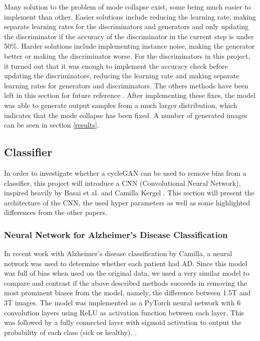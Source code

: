 \documentclass[12pt, fleqn, titlepage]{article}
\begin{document}
Many solution to the problem of mode collapse exist, some being much easier to implement than other. Easier solutions include reducing the learning rate, making separate learning rates for the discriminators and generators and only updating the discriminator if the accuracy of the discriminator in the current step is under 50\%. Harder solutions include implementing instance noise, making the generator better or making the discriminator worse. For the discriminators in this project, it turned out that it was enough to implement the accuracy check before updating the discriminators, reducing the learning rate and making separate learning rates for generators and discriminators. The others methods have been left in this section for future reference \cite{mode_collapse_reddit_fix}\cite{mode_collapse_github}. After implementing these fixes, the model was able to generate output samples from a much larger distribution, which indicates that the mode collapse has been fixed. A number of generated images can be seen in section \ref{results}.

\subsection{Classifier}

In order to investigate whether a cycleGAN can be used to remove bias from a classifier, this project will introduce a CNN (Convolutional Neural Network), inspired heavily by Basai et al. and Camilla Kergel \cite{CamillaKandidat} \cite{neuro}. This section will present the architecture of the CNN, the used hyper parameters as well as some highlighted differences from the other papers.

\subsubsection{Neural Network for Alzheimer's Disease Classification} \label{camillas_model}
In recent work with Alzheimer's disease classification by Camilla, a neural network was used to determine whether each patient had AD. Since this model was full of bias when used on the original data, we used a very similar model to compare and contrast if the above described methods succeeds in removing the most prominent biases from the model, namely, the difference between 1.5T and 3T images. The model was implemented as a PyTorch neural network with 6 convolution layers using ReLU as activation function between each layer. This was followed by a fully connected layer with sigmoid activation to output the probability of each class (sick or healthy).  \cite{CamillaKandidat}.
\end{document}
